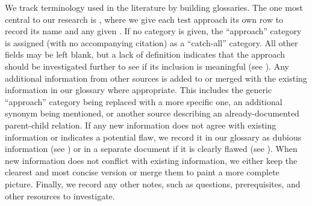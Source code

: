 We track terminology used in the literature by building glossaries. The one
most central to our research is \ourApproachGlossary{}, where we give each
test approach its own row to record its name and any given \approachFields{}.
If no category is given, the ``approach'' category is assigned
(with no accompanying citation) as a ``catch-all'' category. All other fields
may be left blank, but a lack of definition indicates that the approach should
be investigated further to see if its inclusion is meaningful (see
). Any additional information from other sources is added to
or merged with the existing information in our glossary where appropriate.
This includes the generic ``approach'' category being replaced with a more
specific one, an additional synonym being mentioned, or another source
describing an already-documented parent-child relation. If any new information
does not agree with existing information or indicates a potential flaw, we
record it in our glossary as dubious information (see )
or in a separate document if it is clearly flawed (see ).
When new information does not conflict with existing information, we either
keep the clearest and most concise version or merge them to paint a more
complete picture. Finally, we record any other notes, such as questions,
prerequisites, and other resources to investigate.

